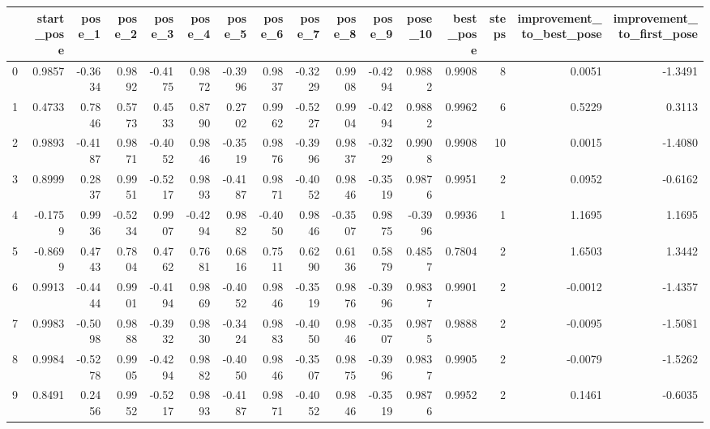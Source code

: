 \begin{tabular}{lrrrrrrrrrrrrrrr}
\toprule
{} &  start\_pose &  pose\_1 &  pose\_2 &  pose\_3 &  pose\_4 &  pose\_5 &  pose\_6 &  pose\_7 &  pose\_8 &  pose\_9 &  pose\_10 &  best\_pose &  steps &  improvement\_to\_best\_pose &  improvement\_to\_first\_pose \\
\midrule
0   &      0.9857 & -0.3634 &  0.9892 & -0.4175 &  0.9872 & -0.3996 &  0.9837 & -0.3229 &  0.9908 & -0.4294 &   0.9882 &     0.9908 &      8 &                    0.0051 &                    -1.3491 \\
1   &      0.4733 &  0.7846 &  0.5773 &  0.4533 &  0.8790 &  0.2702 &  0.9962 & -0.5227 &  0.9904 & -0.4294 &   0.9882 &     0.9962 &      6 &                    0.5229 &                     0.3113 \\
2   &      0.9893 & -0.4187 &  0.9871 & -0.4052 &  0.9846 & -0.3519 &  0.9876 & -0.3996 &  0.9837 & -0.3229 &   0.9908 &     0.9908 &     10 &                    0.0015 &                    -1.4080 \\
3   &      0.8999 &  0.2837 &  0.9951 & -0.5217 &  0.9893 & -0.4187 &  0.9871 & -0.4052 &  0.9846 & -0.3519 &   0.9876 &     0.9951 &      2 &                    0.0952 &                    -0.6162 \\
4   &     -0.1759 &  0.9936 & -0.5234 &  0.9907 & -0.4294 &  0.9882 & -0.4050 &  0.9846 & -0.3507 &  0.9875 &  -0.3996 &     0.9936 &      1 &                    1.1695 &                     1.1695 \\
5   &     -0.8699 &  0.4743 &  0.7804 &  0.4762 &  0.7681 &  0.6816 &  0.7511 &  0.6290 &  0.6136 &  0.5879 &   0.4857 &     0.7804 &      2 &                    1.6503 &                     1.3442 \\
6   &      0.9913 & -0.4444 &  0.9901 & -0.4194 &  0.9869 & -0.4052 &  0.9846 & -0.3519 &  0.9876 & -0.3996 &   0.9837 &     0.9901 &      2 &                   -0.0012 &                    -1.4357 \\
7   &      0.9983 & -0.5098 &  0.9888 & -0.3932 &  0.9830 & -0.3424 &  0.9883 & -0.4050 &  0.9846 & -0.3507 &   0.9875 &     0.9888 &      2 &                   -0.0095 &                    -1.5081 \\
8   &      0.9984 & -0.5278 &  0.9905 & -0.4294 &  0.9882 & -0.4050 &  0.9846 & -0.3507 &  0.9875 & -0.3996 &   0.9837 &     0.9905 &      2 &                   -0.0079 &                    -1.5262 \\
9   &      0.8491 &  0.2456 &  0.9952 & -0.5217 &  0.9893 & -0.4187 &  0.9871 & -0.4052 &  0.9846 & -0.3519 &   0.9876 &     0.9952 &      2 &                    0.1461 &                    -0.6035 \\

\end{tabular}
